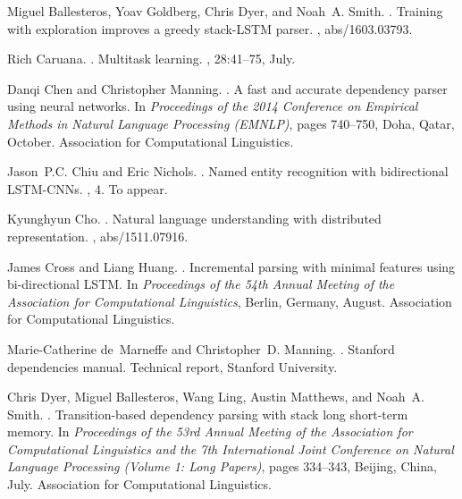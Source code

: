 \documentclass[11pt]{article}
\begin{document}

\begin{thebibliography}{}

Miguel Ballesteros, Yoav Goldberg, Chris Dyer, and Noah~A. Smith.
.
\newblock Training with exploration improves a greedy stack-{LSTM} parser.
, abs/1603.03793.

Rich Caruana.
.
\newblock Multitask learning.
, 28:41--75, July.

Danqi Chen and Christopher Manning.
.
\newblock A fast and accurate dependency parser using neural networks.
\newblock In {\em Proceedings of the 2014 Conference on Empirical Methods in
  Natural Language Processing (EMNLP)}, pages 740--750, Doha, Qatar, October.
  Association for Computational Linguistics.

{Jason}~{P.C.} {Chiu} and {Eric} {Nichols}.
.
\newblock Named entity recognition with bidirectional {LSTM-CNNs}.
,
  4.
\newblock To appear.

Kyunghyun Cho.
.
\newblock Natural language understanding with distributed representation.
, abs/1511.07916.

James Cross and Liang Huang.
.
\newblock Incremental parsing with minimal features using bi-directional
  {LSTM}.
\newblock In {\em Proceedings of the 54th Annual Meeting of the Association for
  Computational Linguistics}, Berlin, Germany, August. Association for
  Computational Linguistics.

Marie-Catherine de~Marneffe and Christopher~D. Manning.
.
\newblock Stanford dependencies manual.
\newblock Technical report, {Stanford University}.

Chris Dyer, Miguel Ballesteros, Wang Ling, Austin Matthews, and Noah~A. Smith.
.
\newblock Transition-based dependency parsing with stack long short-term
  memory.
\newblock In {\em Proceedings of the 53rd Annual Meeting of the Association for
  Computational Linguistics and the 7th International Joint Conference on
  Natural Language Processing (Volume 1: Long Papers)}, pages 334--343,
  Beijing, China, July. Association for Computational Linguistics.


\end{thebibliography}
\end{document}
